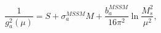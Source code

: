 \begin{equation}
\frac{1}{g^2_a(\mu)} = S + \sigma^{MSSM}_a M + 
\frac{b^{MSSM}_a}{16\pi^2} \ln \frac{M^2_s}{\mu^2} ,
\end{equation}

